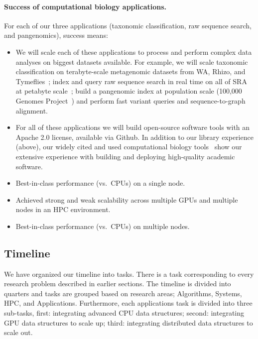 \paragraph{Success of computational biology applications.}
For each of our three applications (taxonomic classification, raw sequence search, and pangenomics), success means:

\begin{itemize}[leftmargin=*,noitemsep]
  \item We will scale each of these applications to process and perform complex data analyses on biggest datasets available. For example, we will scale taxonomic classification on terabyte-scale metagenomic datasets from WA, Rhizo, and Tymeflies~\cite{hofmeyr2020terabase}; index and query raw sequence search in real time on all of SRA at petabyte scale~\cite{kodama2012sequence}; build a pangenomic index at population scale (100,000 Genomes Project~\cite{1002021100}) and perform fast variant queries and sequence-to-graph alignment.
  \item For all of these applications we will build open-source software tools with an Apache 2.0 license, available via Github. In addition to our library experience (above), our widely cited and used computational biology tools~\cite{PandeyABFJP18Cell,PandeyBJP17a,PandeyBJP17b,PandeyBJP17,pandey2020timely,pandey2021variantstore,pandey2021terrace,pandey2022iceberght} show our extensive experience with building and deploying high-quality academic software.
  \item Best-in-class performance (vs.\ CPUs) on a single node.
  \item Achieved strong and weak scalability across multiple GPUs and multiple nodes in an HPC environment.
  \item Best-in-class performance (vs.\ CPUs) on multiple nodes.
\end{itemize}


\subsection{Timeline}

We have organized our timeline into tasks. There is a task corresponding to every research problem described in earlier sections. The timeline is divided into quarters and tasks are grouped based on research areas; Algorithms, Systems, HPC, and Applications. Furthermore, each applications task is divided into three sub-tasks, first: integrating advanced CPU data structures; second: integrating GPU data structures to scale up; third: integrating distributed data structures to scale out.

